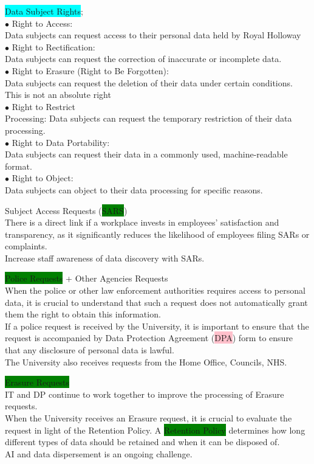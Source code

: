 \documentclass[tikz,border=10pt]{project_plan}
\newcommand{\bulletPoint}{\hspace{-3.1pt}$\bullet$ \hspace{5pt}}
\begin{document}
\colorbox{cyan}{Data Subject Rights};\\
\bulletPoint Right to Access:\\
Data subjects can request access to their personal data held by Royal Holloway \\
\bulletPoint Right to Rectification:\\
Data subjects can request the correction of inaccurate or incomplete data.\\
\bulletPoint Right to Erasure (Right to Be Forgotten):\\
Data subjects can request the deletion of their data under certain conditions. This is not an absolute right\\
\bulletPoint Right to Restrict \\
Processing: Data subjects can request the temporary restriction of their data processing.\\
\bulletPoint Right to Data Portability:\\
Data subjects can request their data in a commonly used, machine-readable format.\\
\bulletPoint Right to Object:\\
Data subjects can object to their data processing for specific reasons.

\newpage

Subject Access Requests (\colorbox{green}{SARS}) \\
There is a direct link if a workplace invests in employees' satisfaction and
transparency, as it significantly reduces the likelihood of employees filing
SARs or complaints. \\
Increase staff awareness of data discovery with SARs.

\colorbox{green}{Police Requests} + Other Agencies Requests\\
When the police or other law enforcement authorities requires access to personal
data, it is crucial to understand that such a request does not automatically
grant them the right to obtain this information. \\
If a police request is received by the University, it is important to ensure
that the request is accompanied by Data Protection Agreement (\colorbox{pink}{DPA}) form to
ensure that any disclosure of personal data is lawful. \\
The University also receives requests from the Home Office, Councils, NHS.

\colorbox{green}{Erasure Requests}  \\
IT and DP continue to work together to improve the processing of Erasure requests. \\
When the University receives an Erasure request, it is crucial to evaluate the
request in light of the Retention Policy. A \colorbox{green}{Retention Policy} determines how long
different types of data should be retained and when it can be disposed of. \\
AI and data dispersement is an ongoing challenge.
\end{document}
